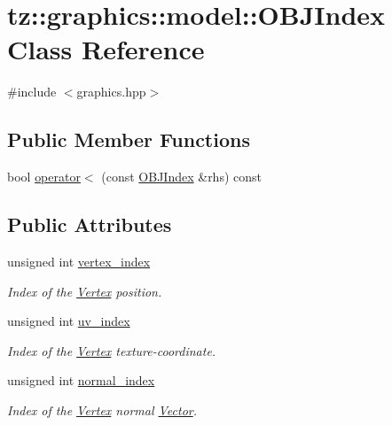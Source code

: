 \hypertarget{classtz_1_1graphics_1_1model_1_1_o_b_j_index}{}\section{tz\+:\+:graphics\+:\+:model\+:\+:O\+B\+J\+Index Class Reference}
\label{classtz_1_1graphics_1_1model_1_1_o_b_j_index}


{\ttfamily \#include $<$graphics.\+hpp$>$}

\subsection*{Public Member Functions}
\begin{DoxyCompactItemize}
\item 
bool \mbox{\hyperlink{classtz_1_1graphics_1_1model_1_1_o_b_j_index_a5bf098fe36d35780bfb094343361ff83}{operator$<$}} (const \mbox{\hyperlink{classtz_1_1graphics_1_1model_1_1_o_b_j_index}{O\+B\+J\+Index}} \&rhs) const
\end{DoxyCompactItemize}
\subsection*{Public Attributes}
\begin{DoxyCompactItemize}
\item 
\mbox{\label{classtz_1_1graphics_1_1model_1_1_o_b_j_index_a9a846338dd6bad77791041f17545dc01}} 
unsigned int \mbox{\hyperlink{classtz_1_1graphics_1_1model_1_1_o_b_j_index_a9a846338dd6bad77791041f17545dc01}{vertex\+\_\+index}}
\begin{DoxyCompactList}\small\item\em Index of the \mbox{\hyperlink{class_vertex}{Vertex}} position. \end{DoxyCompactList}\item 
\mbox{\label{classtz_1_1graphics_1_1model_1_1_o_b_j_index_a9b8794bf6a6414055c2ca0b344e23bab}} 
unsigned int \mbox{\hyperlink{classtz_1_1graphics_1_1model_1_1_o_b_j_index_a9b8794bf6a6414055c2ca0b344e23bab}{uv\+\_\+index}}
\begin{DoxyCompactList}\small\item\em Index of the \mbox{\hyperlink{class_vertex}{Vertex}} texture-\/coordinate. \end{DoxyCompactList}\item 
\mbox{\label{classtz_1_1graphics_1_1model_1_1_o_b_j_index_a75ae0aff1539b1d346f3114478e6037d}} 
unsigned int \mbox{\hyperlink{classtz_1_1graphics_1_1model_1_1_o_b_j_index_a75ae0aff1539b1d346f3114478e6037d}{normal\+\_\+index}}
\begin{DoxyCompactList}\small\item\em Index of the \mbox{\hyperlink{class_vertex}{Vertex}} normal \mbox{\hyperlink{class_vector}{Vector}}. \end{DoxyCompactList}\end{DoxyCompactItemize}


